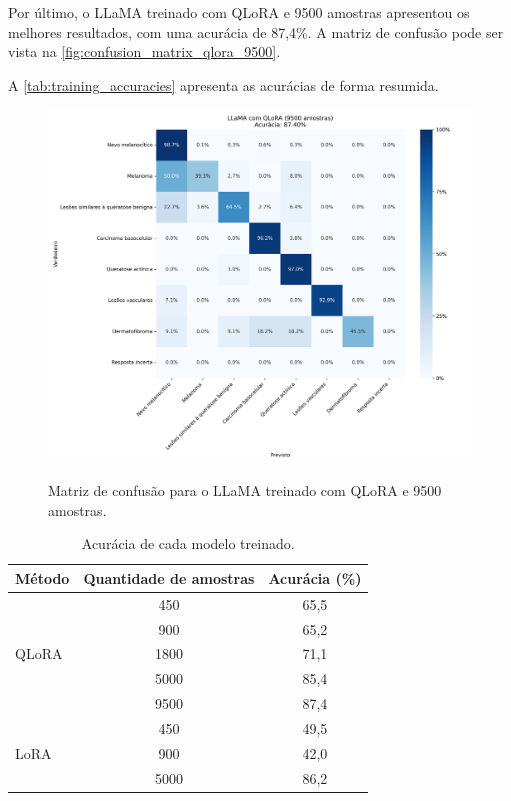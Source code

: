 Por último, o \ac{LLaMA} treinado com \ac{QLoRA} e 9500 amostras apresentou os melhores resultados, com uma acurácia de
87,4\%. A matriz de confusão pode ser vista na \autoref{fig:confusion_matrix_qlora_9500}.

A \autoref{tab:training_accuracies} apresenta as acurácias de forma resumida.

\begin{figure}[ht]
    \centering
    \caption{\small Matriz de confusão para o \ac{LLaMA} treinado com \ac{QLoRA} e 9500 amostras.}
    \includegraphics[width=1\columnwidth,keepaspectratio]{images/confusion_matrix_qlora_9500.png}
    \label{fig:confusion_matrix_qlora_9500}
\end{figure}

\begin{table}[ht]
    \caption{\small Acurácia de cada modelo treinado.}
    \centering
    \begin{tabular}{l|c|c}
        \hline
        Método                      & Quantidade de amostras & Acurácia (\%) \\ \hline
        \multirow{5}{*}{\ac{QLoRA}} & 450                    & 65,5          \\
                                    & 900                    & 65,2          \\
                                    & 1800                   & 71,1          \\
                                    & 5000                   & 85,4          \\
                                    & 9500                   & 87,4          \\ \hline
        \multirow{3}{*}{\ac{LoRA}}  & 450                    & 49,5          \\
                                    & 900                    & 42,0          \\
                                    & 5000                   & 86,2          \\ \hline
    \end{tabular}
    \label{tab:training_accuracies}
\end{table}
